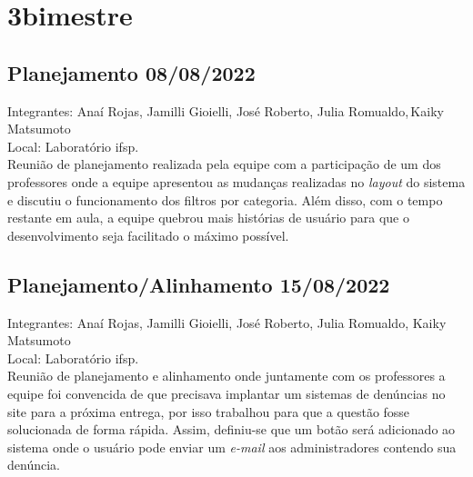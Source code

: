 \section{3\textordmasculine bimestre}

\subsection{Planejamento 08/08/2022}
\noindent Integrantes: Anaí Rojas, Jamilli Gioielli, José Roberto, Julia Romualdo,\,Kaiky Matsumoto \\
Local: Laboratório \acs{ifsp}. \\
Reunião de planejamento realizada pela equipe com a participação de um dos professores onde a equipe apresentou as mudanças realizadas no \textit{layout} do sistema e discutiu o funcionamento dos filtros por categoria. Além disso, com o tempo restante em aula, a equipe quebrou mais histórias de usuário para que o desenvolvimento seja facilitado o máximo possível.

\subsection{Planejamento/Alinhamento 15/08/2022}
\noindent Integrantes: Anaí Rojas, Jamilli Gioielli, José Roberto, Julia Romualdo, Kaiky Matsumoto \\
Local: Laboratório \acs{ifsp}. \\
Reunião de planejamento e alinhamento onde juntamente com os professores a equipe foi convencida de que precisava implantar um sistemas de denúncias no site para a próxima entrega, por isso trabalhou para que a questão fosse solucionada de forma rápida. Assim, definiu-se que um botão será adicionado ao sistema onde o usuário pode enviar um \textit{ e-mail} aos administradores contendo sua denúncia. 